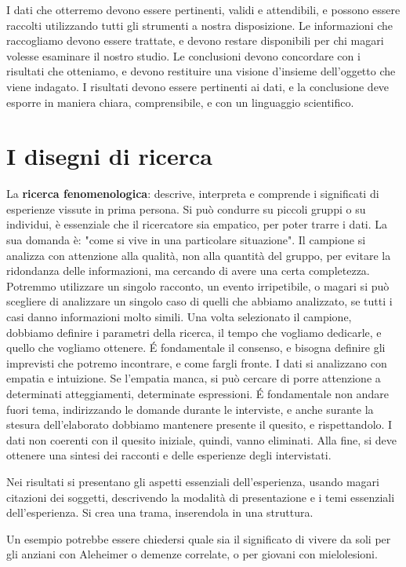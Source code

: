 I dati che otterremo devono essere pertinenti, validi e attendibili, e possono essere raccolti utilizzando tutti gli strumenti a nostra disposizione.
Le informazioni che raccogliamo devono essere trattate, e devono restare disponibili per chi magari volesse esaminare il nostro studio.
Le conclusioni devono concordare con i risultati che otteniamo, e devono restituire una visione d'insieme dell'oggetto che viene indagato.
I risultati devono essere pertinenti ai dati, e la conclusione deve esporre in maniera chiara, comprensibile, e con un linguaggio scientifico.

\section{I disegni di ricerca}
La \textbf{ricerca fenomenologica}: descrive, interpreta e comprende i significati di esperienze vissute in prima persona. Si può condurre su piccoli gruppi o su individui, è essenziale che il ricercatore sia empatico, per poter trarre i dati.
La sua domanda è: "come si vive in una particolare situazione". Il campione si analizza con attenzione alla qualità, non alla quantità del gruppo, per evitare la ridondanza delle informazioni, ma cercando di avere una certa completezza. Potremmo utilizzare un singolo racconto, un evento irripetibile, o magari si può scegliere di analizzare un singolo caso di quelli che abbiamo analizzato, se tutti i casi danno informazioni molto simili. Una volta selezionato il campione, dobbiamo definire i parametri della ricerca, il tempo che vogliamo dedicarle, e quello che vogliamo ottenere. \'E fondamentale il consenso, e bisogna definire gli imprevisti che potremo incontrare, e come fargli fronte.
I dati si analizzano con empatia e intuizione. Se l'empatia manca, si può cercare di porre attenzione a determinati atteggiamenti, determinate espressioni.
\'E fondamentale non andare fuori tema, indirizzando le domande durante le interviste, e anche surante la stesura dell'elaborato dobbiamo mantenere presente il quesito, e rispettandolo. I dati non coerenti con il quesito iniziale, quindi, vanno eliminati. Alla fine, si deve ottenere una sintesi dei racconti e delle esperienze degli intervistati.

Nei risultati si presentano gli aspetti essenziali dell'esperienza, usando magari citazioni dei soggetti, descrivendo la modalità di presentazione e i temi essenziali dell'esperienza. Si crea una trama, inserendola in una struttura.

Un esempio potrebbe essere chiedersi quale sia il significato di vivere da soli per gli anziani con Aleheimer o demenze correlate, o per giovani con mielolesioni. 

